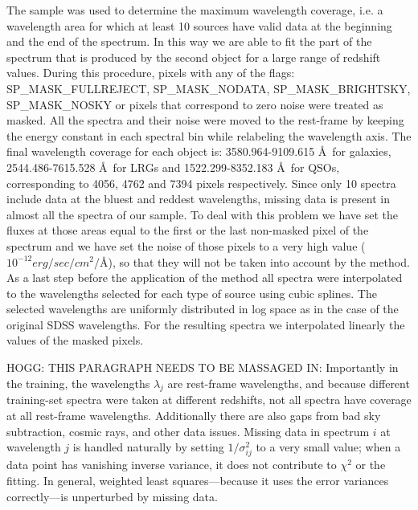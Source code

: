 \documentclass[12pt,preprint]{aastex}
\begin{document}
The sample was used to determine the maximum wavelength coverage, i.e. a wavelength area for which at least 10 sources have valid data at the beginning and the end of the spectrum. In this way we are able to fit the part of the spectrum that is produced by the second object for a large range of redshift values. During this procedure, pixels with any of the flags: SP\_MASK\_FULLREJECT, SP\_MASK\_NODATA, SP\_MASK\_BRIGHTSKY, SP\_MASK\_NOSKY or pixels that correspond to zero noise were treated as masked. All the spectra and their noise were moved to the rest-frame by keeping the energy constant in each spectral bin while relabeling the wavelength axis.  The final wavelength coverage for each object is: 3580.964-9109.615 \AA\ for galaxies, 2544.486-7615.528 \AA\ for LRGs and 1522.299-8352.183 \AA\ for QSOs, corresponding to 4056, 4762 and 7394 pixels respectively. Since only 10 spectra include data at the bluest and reddest wavelengths, missing data is present in almost all the spectra of our sample. To deal with this problem we have set the fluxes at those areas equal to the first or the last non-masked pixel of the spectrum and we have set the noise of those pixels to a very high value ($10^{-12} erg/sec/cm^2/$\AA), so that they will not be taken into account by the method. As a last step before the application of the method all spectra were interpolated to the wavelengths selected for each type of source using cubic splines. The selected wavelengths are uniformly distributed in log space as in the case of the original SDSS wavelengths. For the resulting spectra we interpolated linearly the values of the masked pixels.

HOGG: THIS PARAGRAPH NEEDS TO BE MASSAGED IN: Importantly in the training,
the wavelengths $\lambda_j$ are rest-frame wavelengths, and because
different training-set spectra were taken at different redshifts, not
all spectra have coverage at all rest-frame wavelengths. Additionally
there are also gaps from bad sky subtraction, cosmic rays, and other
data issues.  Missing data in spectrum $i$ at wavelength $j$ is
handled naturally by setting $1/\sigma^2_{ij}$ to a very small value;
when a data point has vanishing inverse variance, it does not
contribute to $\chi^2$ or the fitting. In general, weighted least
squares---because it uses the error variances correctly---is
unperturbed by missing data.
\end{document}
